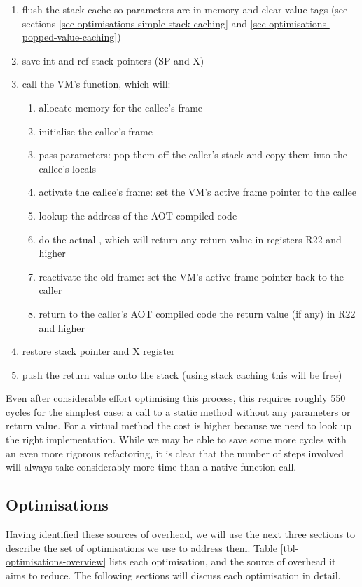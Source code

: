 \begin{enumerate}
  \small
  \item flush the stack cache so parameters are in memory and clear value tags (see sections \ref{sec-optimisations-simple-stack-caching} and \ref{sec-optimisations-popped-value-caching})
  \item save int and ref stack pointers (SP and X)
  \item call the VM's  function, which will:
  \begin{enumerate}
    \item allocate memory for the callee's frame
    \item initialise the callee's frame
    \item pass parameters: pop them off the caller's stack and copy them into the callee's locals
    \item activate the callee's frame: set the VM's active frame pointer to the callee
    \item lookup the address of the AOT compiled code
    \item do the actual , which will return any return value in registers R22 and higher
    \item reactivate the old frame: set the VM's active frame pointer back to the caller
    \item return to the caller's AOT compiled code the return value (if any) in R22 and higher
  \end{enumerate}
  \item restore stack pointer and X register
  \item push the return value onto the stack (using stack caching this will be free)
\end{enumerate}

Even after considerable effort optimising this process, this requires roughly 550 cycles for the simplest case: a call to a static method without any parameters or return value. For a virtual method the cost is higher because we need to look up the right implementation. While we may be able to save some more cycles with an even more rigorous refactoring, it is clear that the number of steps involved will always take considerably more time than a native function call.

\subsection{Optimisations}
\label{sec-optimisations-java-source}
Having identified these sources of overhead, we will use the next three sections to describe the set of optimisations we use to address them. Table \ref{tbl-optimisations-overview} lists each optimisation, and the source of overhead it aims to reduce. The following sections will discuss each optimisation in detail.

